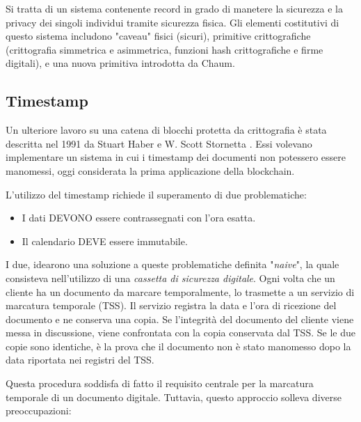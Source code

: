 Si tratta di un sistema contenente record in grado di manetere la sicurezza e la privacy dei singoli individui tramite sicurezza fisica. Gli elementi costitutivi di questo sistema includono "caveau" fisici (sicuri), primitive crittografiche (crittografia simmetrica e asimmetrica, funzioni hash crittografiche e firme digitali), e una nuova primitiva introdotta da Chaum.

\subsection{Timestamp}
Un ulteriore lavoro su una catena di blocchi protetta da crittografia è stata descritta nel 1991 da Stuart Haber e W. Scott Stornetta \cite{haber1990time}. Essi volevano implementare un sistema in cui i timestamp dei documenti non potessero essere manomessi, oggi considerata la prima applicazione della blockchain.

L'utilizzo del timestamp richiede il superamento di due problematiche:
\begin{itemize}
  \item I dati DEVONO essere contrassegnati con l'ora esatta.
  \item Il calendario DEVE essere immutabile.
\end{itemize}

I due, idearono una soluzione a queste problematiche definita "\textit{naive}", la quale consisteva nell'utilizzo di una \textit{cassetta di sicurezza digitale}. Ogni volta che un cliente ha un documento da marcare temporalmente, lo trasmette a un servizio di marcatura temporale (TSS). Il servizio registra la data e l'ora di ricezione del documento e ne conserva una copia. Se l'integrità del documento del cliente viene messa in discussione, viene confrontata con la copia conservata dal TSS. Se le due copie sono identiche, è la prova che il documento non è stato manomesso dopo la data riportata nei registri del TSS.

Questa procedura soddisfa di fatto il requisito centrale per la marcatura temporale di un documento digitale. Tuttavia, questo approccio solleva diverse preoccupazioni:

